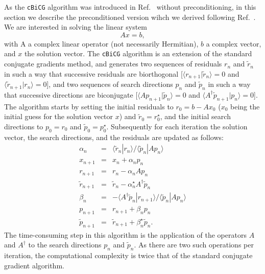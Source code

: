 \documentclass[twocolumn,prb,showpacs,superscriptaddress]{revtex4}
\def\>{\rangle}
\def\<{\langle}
\def\rt{\tilde{r}}
\def\pt{\tilde{p}}
\begin{document}
As the {\tt cBiCG} algorithm was introduced in Ref.\  
without preconditioning, in this section we describe the preconditioned version 
wihch we derived following Ref.~.
%
We are interested in solving the linear system
  \begin{equation}\label{eq.axeqb}
  Ax=b,
  \end{equation}
with A a complex linear operator (not necessarily Hermitian), $b$ a complex 
vector, and $x$ the solution vector.
The {\tt cBiCG} algorithm is an extension of the standard conjugate
gradients method, and generates two sequences of residuals $r_n$ and
$\rt_n$ in such a way that successive residuals 
are biorthogonal [$\<r_{n+1}|\rt_n\>=0$ and $\<\rt_{n+1}|r_n\>=0$], 
and two sequences of search directions 
$p_n$ and $\pt_n$ in such a way that successive directions
are biconjugate [$\< A p_{n+1}|\pt_n \> =0$ and 
$\< A^\dagger \pt_{n+1}|p_n \> =0$].\cite{jacobs}
The algorithm starts by setting the initial residuals to
$r_0 = b-Ax_0$ ($x_0$ being the initial guess for the solution vector $x$) 
and $\rt_0=r_0^\star$, and the initial search directions to $p_0=r_0$ 
and $\pt_0=p_0^\star$.
Subsequently for each iteration the solution
vector, the search directions, and the residuals are updated as follows:
  \begin{eqnarray}
  \alpha_n & = & \<\rt_n|r_n\>/\<\pt_n|Ap_n\> \label{eq.cg1}  \\ 
  x_{n+1} & = & x_n + \alpha_n p_n \label{eq.cg2} \\ 
  r_{n+1} & = & r_n - \alpha_n Ap_n \label{eq.cg3} \\ 
  \rt_{n+1} & = & \rt_n - \alpha_n^\star A^\dagger \pt_n \label{eq.cg4}\\ 
  \beta_n & = & - \<A^\dagger\pt_n|r_{n+1}\>/\<\pt_n|Ap_n\> \label{eq.cg5}\\ 
  p_{n+1} & = & r_{n+1} + \beta_n p_n \label{eq.cg6}\\ 
  \pt_{n+1} & = & \rt_{n+1} + \beta_n^\star \label{eq.cg7} \pt_n. 
  \end{eqnarray}
The time-consuming step in this algorithm is the application of the operators
$A$ and $A^\dagger$ to the search directions $p_n$ and $\pt_n$. 
As there are two such operations per iteration, the computational complexity 
is twice that of the standard conjugate gradient algorithm.
\end{document}

